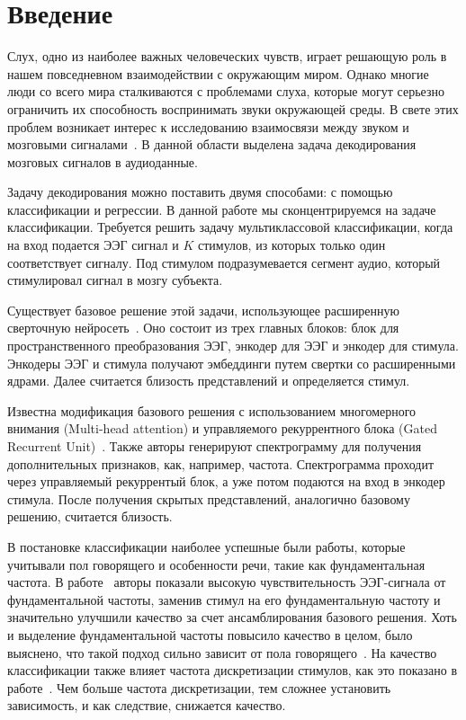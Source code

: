 \documentclass{article}
\begin{document}
\section{Введение} 
    \par 
    Слух, одно из наиболее важных человеческих чувств, играет решающую роль в нашем повседневном взаимодействии с окружающим миром. Однако многие люди со всего мира сталкиваются с проблемами слуха, которые могут серьезно ограничить их способность воспринимать звуки окружающей среды. В свете этих проблем возникает интерес к исследованию взаимосвязи между звуком и мозговыми сигналами~\citep{audioeeg}. В данной области выделена задача декодирования мозговых сигналов в аудиоданные. 
    \par 
    Задачу декодирования можно поставить двумя способами: с помощью классификации и регрессии. В данной работе мы сконцентрируемся на задаче классификации. Требуется решить задачу мультиклассовой классификации, когда на вход подается ЭЭГ сигнал и $K$ стимулов, из которых только один соответствует сигналу. Под стимулом подразумевается сегмент аудио, который стимулировал сигнал в мозгу субъекта. 
    \par 
    Существует базовое решение этой задачи, использующее расширенную сверточную нейросеть~\citep{Accou2021ModelingTR}. Оно состоит из трех главных блоков: блок для пространственного преобразования ЭЭГ, энкодер для ЭЭГ и энкодер для стимула. Энкодеры ЭЭГ и стимула получают эмбеддинги путем свертки со расширенными ядрами. Далее считается близость представлений и определяется стимул.
    \par 
    Известна модификация базового решения с использованием многомерного внимания (Multi-head attention) и управляемого рекуррентного блока (Gated Recurrent Unit)~\citep{multihead-gru}. Также авторы генерируют спектрограмму для получения дополнительных признаков, как, например, частота. Спектрограмма проходит через управляемый рекуррентый блок, а уже потом подаются на вход в энкодер стимула. После получения скрытых представлений, аналогично базовому решению, считается близость.
    \par 
    В постановке классификации наиболее успешные были работы, которые учитывали пол говорящего и особенности речи, такие как фундаментальная частота. В работе~\citep{Thornton2023RelatingER} авторы показали высокую чувствительность ЭЭГ-сигнала от фундаментальной частоты, заменив стимул на его фундаментальную частоту и значительно улучшили качество  за счет ансамблирования базового решения. Хоть и выделение фундаментальной частоты повысило качество в целом, было выяснено, что такой подход сильно зависит от пола говорящего~\citep{Puffay2022RelatingTF}. На качество классификации также влияет частота дискретизации стимулов, как это показано в работе~\citep{Thornton2024DetectingGR}. Чем больше частота дискретизации, тем сложнее установить зависимость, и как следствие, снижается качество. 
\end{document}

